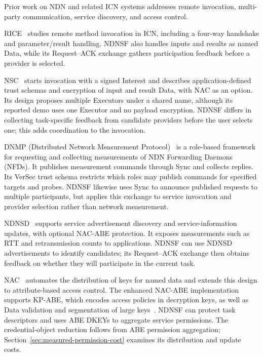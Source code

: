 Prior work on NDN and related ICN systems addresses remote invocation, multi-party communication, service discovery, and access control.

RICE~\cite{krol2018rice} studies remote method invocation in ICN, including a four-way handshake and parameter/result handling. NDNSF also handles inputs and results as named Data, while its Request--ACK exchange gathers participation feedback before a provider is selected.

NSC~\cite{meirovitch2021nsc} starts invocation with a signed Interest and describes application-defined trust schemas and encryption of input and result Data, with NAC as an option. Its design proposes multiple Executors under a shared name, although its reported demo uses one Executor and no payload encryption. NDNSF differs in collecting task-specific feedback from candidate providers before the user selects one; this adds coordination to the invocation.

DNMP (Distributed Network Measurement Protocol)~\cite{nichols2019dnmp} is a role-based framework for requesting and collecting measurements of NDN Forwarding Daemons (NFDs). It publishes measurement commands through Sync and collects replies. Its VerSec trust schema restricts which roles may publish commands for specified targets and probes. NDNSF likewise uses Sync to announce published requests to multiple participants, but applies this exchange to service invocation and provider selection rather than network measurement.

NDNSD~\cite{dulal2022ndnsd} supports service advertisement discovery and service-information updates, with optional NAC-ABE protection. It exposes measurements such as RTT and retransmission counts to applications. NDNSF can use NDNSD advertisements to identify candidates; its Request--ACK exchange then obtains feedback on whether they will participate in the current task.

NAC~\cite{zhang2018nac} automates the distribution of keys for named data and extends this design to attribute-based access control. The enhanced NAC-ABE implementation supports KP-ABE, which encodes access policies in decryption keys, as well as Data validation and segmentation of large keys~\cite{dulal2023nac-abe}. NDNSF can protect task descriptors and uses ABE DKEYs to aggregate service permissions. The credential-object reduction follows from ABE permission aggregation; Section~\ref{sec:measured-permission-cost} examines its distribution and update costs.
